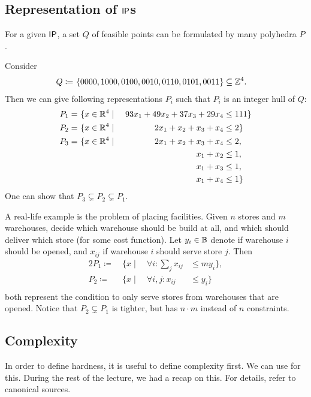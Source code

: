 \subsection{Representation of $\mathsf{IP}$s}
For a given $\mathsf{IP}$, a set $Q$ of feasible points can be formulated by many polyhedra $P$.
\begin{example}
    Consider
    \begin{align*}
        Q \coloneqq & \ \{0000,1000,0100,0010,0110,0101,0011\} \subseteq \mathbb{Z}^4.
    \end{align*}
    Then we can give following representations $P_i$ such that $P_i$ is an integer hull of $Q$:
    \begin{alignat*}{2}
        P_1 =\  & \{x \in \mathbb{R}^4  \mid \  & 93 x_1 + 49x_2 + 37x_3+29x_4 & \leq 111\} \\
        P_2 =\  & \{x \in \mathbb{R}^4  \mid    & 2 x_1 + x_2 + x_3+ x_4       & \leq 2\}   \\
        P_3 =\  & \{x \in \mathbb{R}^4  \mid    & 2 x_1 + x_2 + x_3+ x_4       & \leq 2,    \\
                &                             & x_1 + x_2                    & \leq 1,    \\
                &                             & x_1 + x_3                    & \leq 1,    \\
                &                             & x_1 + x_4                    & \leq 1\}
    \end{alignat*}
    One can show that $P_3 \subsetneq P_2 \subsetneq P_1$.
\end{example}
\begin{example}
    A real-life example is the problem of placing facilities.
    Given $n$ stores and $m$ warehouses, decide which warehouse should be build at all, and which should deliver which store (for some cost function).
    Let $y_i \in \mathbb{B}$ denote if warehouse $i$ should be opened, and $x_{ij}$ if warehouse $i$ should serve store $j$.
    Then
    \begin{alignat*}{2}
        P_1 \coloneqq \  & \{x \mid \  & \forall i: \sum_j x_{ij} & \leq my_i \}, \\
        P_2 \coloneqq \  & \{x \mid \  & \forall i,j: x_{ij}      & \leq y_i\}    \\
    \end{alignat*}
    both represent the condition to only serve stores from warehouses that are opened.
    Notice that $P_2 \subsetneq P_1$ is tighter, but has $n \cdot m$ instead of $n$ constraints.
\end{example}

\subsection{Complexity}
In order to define hardness, it is useful to define complexity first.
We can use  for this. During the rest of the lecture,
we had a recap on this. For details, refer to canonical sources.

